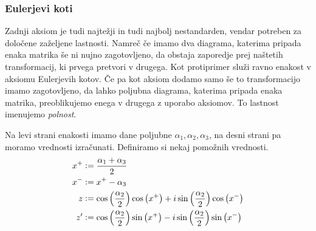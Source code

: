 \documentclass[mat1]{fmfdelo}
\newcommand{\defeq}{\vcentcolon=}
\begin{document}
\subsubsection{Eulerjevi koti} \label{euler}
Zadnji aksiom je tudi najtežji in tudi najbolj nestandarden, vendar potreben za določene zaželjene lastnosti. Namreč če imamo dva diagrama, katerima pripada enaka matrika še ni nujno zagotovljeno, da obstaja zaporedje prej naštetih transformacij, ki prvega pretvori v drugega. Kot protiprimer služi ravno enakost v aksiomu Eulerjevih kotov. Če pa kot aksiom dodamo samo še to transformacijo imamo zagotovljeno, da lahko poljubna diagrama, katerima pripada enaka matrika, preoblikujemo enega v drugega z uporabo aksiomov. To lastnost imenujemo \emph{polnost}.
\begin{center}
\end{center}
Na levi strani enakosti imamo dane poljubne \(\alpha_1,\alpha_2,\alpha_3\), na desni strani pa moramo vrednosti izračunati. Definiramo si nekaj pomožnih vrednosti.
\begin{align*}
    x^+ &\defeq \frac{\alpha_1 + \alpha_3}{2}\\
    x^- &\defeq x^+-\alpha_3\\
    z &\defeq \cos\left(\frac{\alpha_2}{2}\right)\cos\left(x^+\right) + i\sin\left(\frac{\alpha_2}{2}\right)\cos\left(x^-\right)\\
    z' &\defeq \cos\left(\frac{\alpha_2}{2}\right)\sin\left(x^+\right) - i\sin\left(\frac{\alpha_2}{2}\right)\sin\left(x^-\right)
\end{align*}
\end{document}
